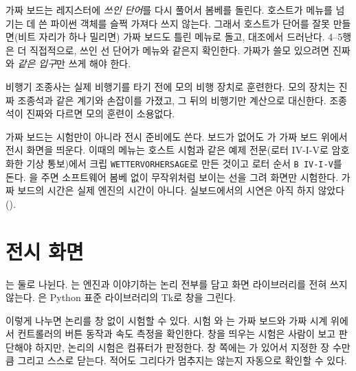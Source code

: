 \Why 가짜 보드는 레지스터에 \emph{쓰인 단어}를 다시 풀어서 봄베를 돌린다. 호스트가 메뉴를 넘기는 데 쓴 파이썬
객체를 슬쩍 가져다 쓰지 않는다. 그래서 호스트가 단어를 잘못 만들면(비트 자리가 하나 밀리면) 가짜 보드도 틀린
메뉴로 돌고, 대조에서 드러난다. 4--5행은 더 직접적으로, 쓰인 선 단어가 메뉴와 같은지 확인한다. 가짜가 쓸모 있으려면
진짜와 \emph{같은 입구}만 쓰게 해야 한다.

\General 비행기 조종사는 실제 비행기를 타기 전에 모의 비행 장치로 훈련한다. 모의 장치는 진짜 조종석과 같은 계기와
손잡이를 가졌고, 그 뒤의 비행기만 계산으로 대신한다. 조종석이 진짜와 다르면 모의 훈련이 소용없다.

\Ours 가짜 보드는 시험만이 아니라 전시 준비에도 쓴다. 보드가 없어도 가 가짜 보드
위에서 전시 화면을 띄운다. 이때의 메뉴는 호스트 시험과 같은 예제 전문(로터 IV-I-V로 암호화한 기상 통보)에서 크립
\texttt{WETTERVORHERSAGE}로 만든 것이고 로터 순서 \texttt{B IV-I-V}를 돈다. 을 주면 소프트웨어
봄베 없이 무작위처럼 보이는 선을 그려 화면만 시험한다. 가짜 보드의 시간은 실제 엔진의 시간이 아니다. 실보드에서의
시연은 아직 하지 않았다().

\section{전시 화면}\label{sec:h-visual}

는 둘로 나뉜다. 는 엔진과 이야기하는 논리 전부를 담고 화면 라이브러리를
전혀 쓰지 않는다. 은 Python 표준 라이브러리의 Tk로 창을 그린다.

\Why 이렇게 나누면 논리를 창 없이 시험할 수 있다. 시험 와
는 가짜 보드와 가짜 시계 위에서 컨트롤러의 버튼 동작과 속도 측정을 확인한다.
창을 띄우는 시험은 사람이 보고 판단해야 하지만, 논리의 시험은 컴퓨터가 판정한다. 창 쪽에는 가
있어서 지정한 장 수만큼 그리고 스스로 닫는다. 적어도 그리다가 멈추지는 않는지 자동으로 확인할 수 있다.

